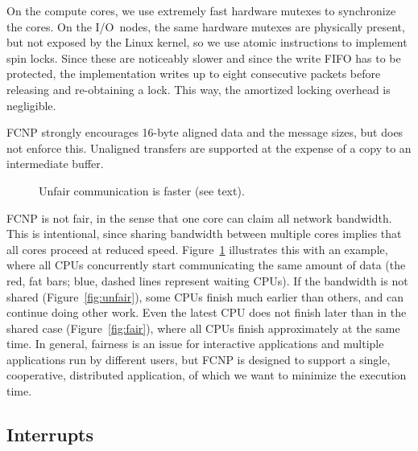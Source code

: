 \documentclass[journal]{IEEEtran}
\begin{document}
On the compute cores, we use extremely fast hardware mutexes to synchronize
the cores.
On the I/O~nodes, the same hardware mutexes are physically present, but not
exposed by the Linux kernel, so we use atomic instructions to implement spin
locks.
Since these are noticeably slower and since the write FIFO has to be protected,
the implementation writes up to eight consecutive packets before releasing
and re-obtaining a lock.
This way, the amortized locking overhead is negligible.

FCNP strongly encourages 16-byte aligned data and the message sizes, but
does not enforce this.
Unaligned transfers are supported at the expense of a copy to an
intermediate buffer.

\begin{figure}[h]
\begin{center}
\begin{vbox}
\end{vbox}
\vspace{5mm}
\end{center}
\caption{Unfair communication is faster (see text).}
\label{fig:fair-unfair}
\end{figure}

FCNP is not fair, in the sense that one core can claim all network bandwidth.
This is intentional, since sharing bandwidth between multiple cores implies
that all cores proceed at reduced speed.
Figure~\ref{fig:fair-unfair} illustrates this with an example, where all
CPUs concurrently start communicating the same amount of data (the red, fat
bars; blue, dashed lines represent waiting CPUs).
If the bandwidth is not shared (Figure~\ref{fig:unfair}), some CPUs finish
much earlier than others, and can continue doing other work.
Even the latest CPU does not finish later than in the shared case
(Figure~\ref{fig:fair}), where all CPUs finish approximately at the same time.
In general, fairness is an issue for interactive applications and multiple
applications run by different users, but FCNP is designed to support a single,
cooperative, distributed application, of which we want to minimize the
execution time.


\subsection{Interrupts}
\label{sec:interrupts}
\end{document}
